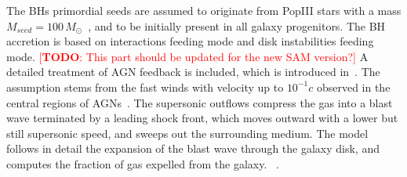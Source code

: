 \documentclass[twocolumn]{aastex631}
\newcommand{\todo}[1]{\textcolor{red}{[{\bf TODO}: #1]}}
\begin{document}
The BHs primordial seeds are assumed to originate from PopIII stars with a mass $M_{seed}=100\,M_{\odot}$~\citep{Madau2001}, and to be initially present in all galaxy progenitors. The BH accretion is based on interactions feeding mode and disk instabilities feeding mode.
\todo{This part should be updated for the new SAM version?}
A detailed treatment of AGN feedback is included, which is introduced in~\citet{Menci2008}. The assumption stems from the fast winds with velocity up to 
$10^{-1}c$ observed in the central regions of AGNs~\citep{Chartas2002, Pounds2003}. The supersonic outflows compress the gas into a blast wave terminated by a leading shock front, which moves outward with a lower but still supersonic speed, and sweeps out the surrounding medium. The model follows in detail the expansion of the blast wave through the galaxy disk, and computes the fraction of gas expelled from the galaxy. ~\citep[see, i.e.,][for the details.]{Menci2016}. 
\end{document}
